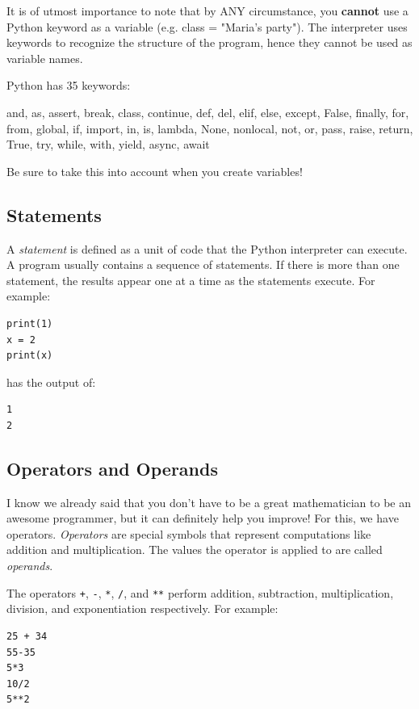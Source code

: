 It is of utmost importance to note that by ANY circumstance, you \textbf{cannot} use a Python keyword as a variable (e.g. class = "Maria's party"). The interpreter uses keywords to recognize the structure of the program, hence they cannot be used as variable names.

Python has 35 keywords:

\begin{minipage}{\linewidth}
    \begin{spverbatim}
        and, as, assert, break, class, continue, def, del, elif, else, except, False, finally, for, from, global, if, import, in, is, lambda, None, nonlocal, not, or, pass, raise, return, True, try, while, with, yield, async, await
    \end{spverbatim}
\end{minipage}

Be sure to take this into account when you create variables!

\subsection{Statements}
A \textit{statement} is defined as a unit of code that the Python interpreter can execute. A program usually contains a sequence of statements. If there is more than one statement, the results appear one at a time as the statements execute. For example:
\begin{verbatim}
print(1)
x = 2
print(x)
\end{verbatim}

has the output of:
\begin{verbatim}
1
2
\end{verbatim}

\subsection{Operators and Operands}
I know we already said that you don't have to be a great mathematician to be an awesome programmer, but it can definitely help you improve! For this, we have operators. \textit{Operators} are special symbols that represent computations like addition and multiplication. The values the operator is applied to are called \textit{operands}.

The operators \texttt{+}, \texttt{-}, \texttt{*}, \texttt{/}, and \texttt{**} perform addition, subtraction, multiplication, division, and exponentiation respectively. For example:
\begin{verbatim}
25 + 34
55-35
5*3
10/2
5**2
\end{verbatim}

